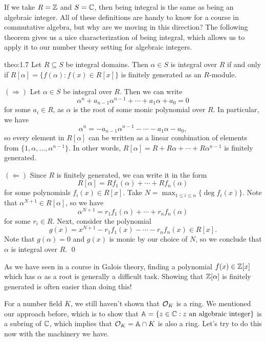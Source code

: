 If we take $R = \mathbb{Z}$ and $S = \mathbb{C}$, then being integral is the same as 
being an algebraic integer. All of these definitions are handy to know
for a course in commutative algebra, but why are we moving in this direction? 
The following theorem gives us a nice characterization of being integral, 
which allows us to apply it to our number theory setting for algebraic integers.

\begin{theo}{theo:1.7}
    Let $R \subseteq S$ be integral domains. Then $\alpha \in S$ is integral 
    over $R$ if and only if $R[\alpha] = \{f(\alpha) : f(x) \in R[x]\}$ is 
    finitely generated as an $R$-module. 
\end{theo}
\begin{pf}
    $(\Rightarrow)$ Let $\alpha \in S$ be integral over $R$. Then we can write 
    \[ \alpha^n + a_{n-1} \alpha^{n-1} + \cdots + a_1 \alpha + a_0 = 0 \] 
    for some $a_i \in R$, as $\alpha$ is the root of some monic polynomial over 
    $R$. In particular, we have 
    \[ \alpha^n = -a_{n-1} \alpha^{n-1} - \cdots - a_1 \alpha - a_0, \] 
    so every element in $R[\alpha]$ can be written as a linear combination 
    of elements from $\{1, \alpha, \dots, \alpha^{n-1}\}$. In other words, 
    $R[\alpha] = R + R\alpha + \cdots + R\alpha^{n-1}$ is finitely generated. 

    $(\Leftarrow)$ Since $R$ is finitely generated, we can write it in the form 
    \[ R[\alpha] = Rf_1(\alpha) + \cdots + Rf_n(\alpha) \] 
    for some polynomials $f_i(x) \in R[x]$. Take $N = \max_{1\leq i \leq n} 
    \{\deg f_i(x)\}$. Note that $\alpha^{N+1} \in R[\alpha]$, so we have 
    \[ \alpha^{N+1} = r_1 f_1(\alpha) + \cdots + r_n f_n(\alpha) \] 
    for some $r_i \in R$. Next, consider the polynomial 
    \[ g(x) = x^{N+1} - r_1 f_1(x) - \cdots - r_n f_n(x) \in R[x]. \] 
    Note that $g(\alpha) = 0$ and $g(x)$ is monic by our choice of $N$, so we conclude that 
    $\alpha$ is integral over $R$. \qed 
\end{pf}\vspace{-0.25cm}

As we have seen in a course in Galois theory, finding a polynomial 
$f(x) \in \mathbb{Z}[x]$ which has $\alpha$ as a root is generally a difficult task.
Showing that $\mathbb{Z}[\alpha]$ is finitely generated is often easier than doing this!

For a number field $K$, we still haven't shown that ${\cal O}_K$ is a ring. 
We mentioned our approach before, which is to show that 
$\mathbb{A} = \{z \in \mathbb{C} : z \text{ an algebraic integer}\}$ is a 
subring of $\mathbb{C}$, which implies that ${\cal O}_K = \mathbb{A} \cap K$ is also 
a ring. Let's try to do this now with the machinery we have. 

